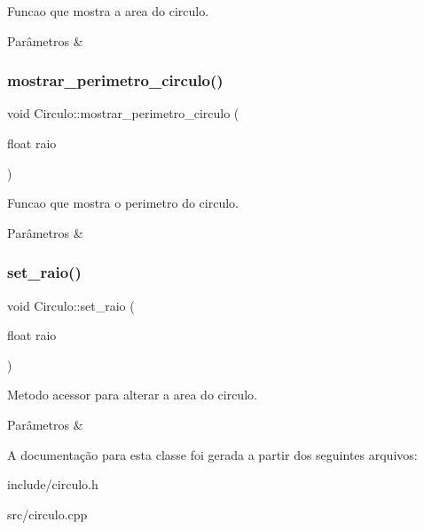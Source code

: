 Funcao que mostra a area do circulo. 


\begin{DoxyParams}{Parâmetros}
{\em } & \\
\hline
\end{DoxyParams}
\mbox{\label{classCirculo_ac5a5f03cc0940179a9684129361c76ba}} 
\subsubsection{\texorpdfstring{mostrar\+\_\+perimetro\+\_\+circulo()}{mostrar\_perimetro\_circulo()}}
{\footnotesize\ttfamily void Circulo\+::mostrar\+\_\+perimetro\+\_\+circulo (\begin{DoxyParamCaption}\item[{float}]{raio }\end{DoxyParamCaption})}



Funcao que mostra o perimetro do circulo. 


\begin{DoxyParams}{Parâmetros}
{\em } & \\
\hline
\end{DoxyParams}
\mbox{\label{classCirculo_a8e3aaa58470094b99c94efcf8891f84a}} 
\subsubsection{\texorpdfstring{set\+\_\+raio()}{set\_raio()}}
{\footnotesize\ttfamily void Circulo\+::set\+\_\+raio (\begin{DoxyParamCaption}\item[{float}]{raio }\end{DoxyParamCaption})}



Metodo acessor para alterar a area do circulo. 


\begin{DoxyParams}{Parâmetros}
{\em } & \\
\hline
\end{DoxyParams}


A documentação para esta classe foi gerada a partir dos seguintes arquivos\+:\begin{DoxyCompactItemize}
\item 
include/circulo.\+h\item 
src/circulo.\+cpp\end{DoxyCompactItemize}
